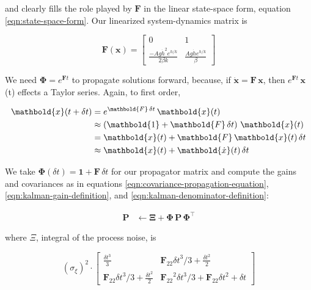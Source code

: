 \documentclass[10pt,oneside,x11names]{article}
\begin{document}
\noindent and clearly fills the role played by \(\mathbold{F}\) in the linear
state-space form, equation \ref{eqn:state-space-form}. Our linearized
system-dynamics matrix is

\begin{equation}
\mathbold{F}(\mathbold{x}) =
\begin{bmatrix}
\underset {  }{ 0 }  &
\underset {  }{ 1 }  \\
\frac{-A g {\dot{h}}^2 e^{{h}/{k}}}{2 \beta  k}  &
\frac{A g {\dot{h}} e^{{h}/{k}}}{\beta }
\end{bmatrix}
\end{equation}

We need \(\mathbold{\Phi}=e^{\mathbold{F}t}\) to propagate solutions forward,
because, if \(\mathbold{\dot{x}}=\mathbold{F}\,\mathbold{x}\), then
\(e^{\mathbold{F}t}\,\mathbold{x}\)(t) effects a Taylor series. Again, to first
order,

\begin{align}
\notag
\mathbold{x}(t+\delta{t}) &= e^{\mathbold{F}\,\delta{t}}\,\mathbold{x}(t) \\
\label{eqn:expand-f}      &\approx \left(\mathbold{1} + \mathbold{F}\,\delta{t}\right)\,\mathbold{x}(t) \\
\notag                    &= \mathbold{x}(t) + \mathbold{F}\,\mathbold{x}(t)\,\delta{t} \\
\notag                    &\approx \mathbold{x}(t) + \mathbold{\dot{x}}(t)\,\delta{t}
\end{align}

\noindent We take
\(\mathbold{\Phi}(\delta{t})=\mathbold{1}+\mathbold{F}\,\delta{t}\) for our
propagator matrix and  compute the gains and covariances as in equations
\ref{eqn:covariance-propagation-equation}, 
\ref{eqn:kalman-gain-definition}, and
\ref{eqn:kalman-denominator-definition}:

\begin{align}
\mathbold{P}
&\leftarrow
\mathbold{\Xi}+
\mathbold{\Phi}\,
\mathbold{P}\,
\mathbold{\Phi}^\intercal
\end{align}

\noindent where \(\Xi\), integral of the process noise, is 

\begin{equation}
\left(\sigma_\xi\right)^2\cdot
\begin{bmatrix}
 \underset{}{\frac{{\delta t}^3}{3}}
&
 \underset{}{{{{\mathbold{F}_{22}}} {\delta t}^3}/{3}+\frac{{\delta t}^2}{2}}
\\
 {{{\mathbold{F}_{22}}} {\delta t}^3}/{3}+\frac{{\delta t}^2}{2} 
&
 {{{\mathbold{F}_{22}}}^2 {\delta t}^3}/{3}+{{\mathbold{F}_{22}}} {\delta t}^2+{\delta t}
\end{bmatrix}
\end{equation}
\end{document}

